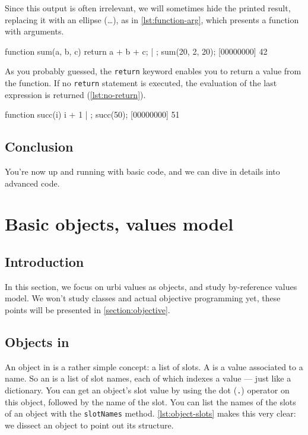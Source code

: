 Since this output is often irrelevant, we will sometimes hide the
printed result, replacing it with an ellipse (\ldots), as in
\autoref{lst:function-arg}, which presents a function with arguments.

\begin{urbiscript}[caption=Function with arguments,label=lst:function-arg]
function sum(a, b, c)
{
  return a + b + c;
} | {};
sum(20, 2, 20);
[00000000] 42
\end{urbiscript}

As you probably guessed, the \texttt{return} keyword enables you to
return a value from the function. If no \texttt{return} statement is
executed, the evaluation of the last expression is returned
(\autoref{lst:no-return}).

\begin{urbiscript}[caption=Return value is the last evaluated value,
  label=lst:no-return]
function succ(i) { i + 1 } | {};
succ(50);
[00000000] 51
\end{urbiscript}

\section{Conclusion}

You're now up and running with basic \urbi code, and we can dive in
details into advanced \urbi code.

\chapter{Basic objects, \urbi values model} %

\section{Introduction}

In this section, we focus on urbi values as objects, and study \urbi
by-reference values model. We won't study classes and actual objective
programming yet, these points will be presented in
\autoref{section:objective}.

\section{Objects in \urbi}
\label{sec:tut:objects}
An object in \urbi is a rather simple concept: a list of slots. A 
is a value associated to a name. So an  is a list of slot
names, each of which indexes a value --- just like a dictionary. You
can get an object's slot value by using the dot (\lstinline{.}) operator
on this object, followed by the name of the slot. You can list the
names of the slots of an object with the \lstinline{slotNames}
method. \autoref{lst:object-slots} makes this very clear: we dissect an object
to point out its structure.

